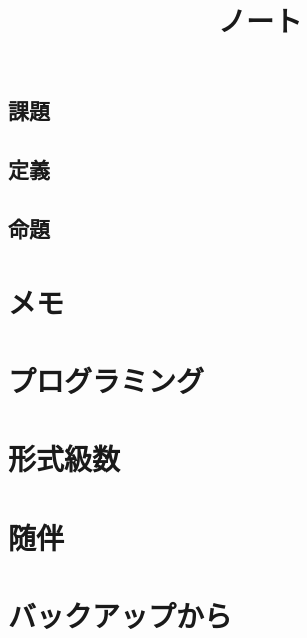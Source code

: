 \documentclass[5pt]{jreport}
\title{ノート}
\author{}
\begin{document}
\maketitle
\tableofcontents
\section*{課題}
\section*{定義}
\section*{命題}

\chapter{メモ}



%
\chapter{プログラミング}


\chapter{形式級数}

\chapter{随伴}

\chapter{バックアップから}




\end{document}

